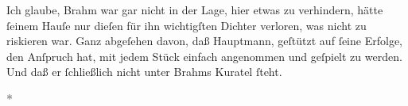{{                  Ich glaube, Brahm war gar nicht in der
                  Lage, hier etwas zu verhindern, hätte{ }ſeinem Hauſe nur dieſen für ihn wichtigſten
                  Dichter verloren, was nicht zu riskieren war. Ganz abgeſehen davon, daß Hauptmann, geſtützt auf{ }ſeine Erfolge, den
                  Anſpruch hat, mit jedem Stück einfach angenommen und geſpielt zu werden. Und daß
                  er{ }ſchließlich nicht unter Brahms Kuratel{ }ſteht.}}\pend
           
\pstart
           \centering{}\textcolor{gray}{\textbf{*}}\pend
           

